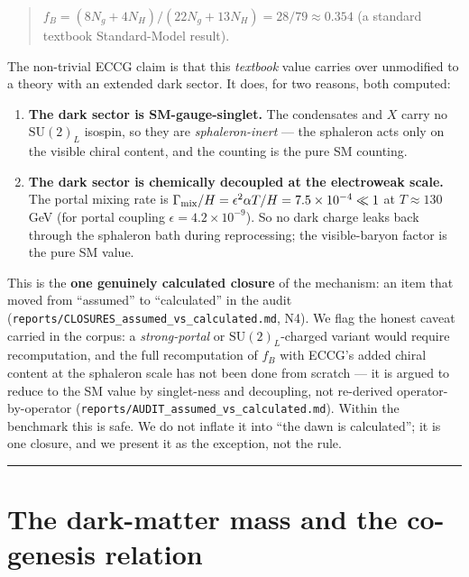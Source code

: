 \documentclass[aps,prd,preprint,nofootinbib,superscriptaddress]{revtex4-2}
\providecommand{\tightlist}{\setlength{\itemsep}{0pt}\setlength{\parskip}{0pt}}
\begin{document}
\begin{quote}
\(f_B = (8 N_g + 4 N_H) / (22 N_g + 13 N_H) = 28/79 \approx 0.354\) (a
standard textbook Standard-Model result).
\end{quote}

The non-trivial ECCG claim is that this \emph{textbook} value carries
over unmodified to a theory with an extended dark sector. It does, for
two reasons, both computed:

\begin{enumerate}
\def\labelenumi{\arabic{enumi}.}
\tightlist
\item
  \textbf{The dark sector is SM-gauge-singlet.} The condensates and
  \(X\) carry no \(\mathrm{SU}(2)_L\) isospin, so they are
  \emph{sphaleron-inert} --- the sphaleron acts only on the visible
  chiral content, and the counting is the pure SM counting.
\item
  \textbf{The dark sector is chemically decoupled at the electroweak
  scale.} The portal mixing rate is
  \(\Gamma_{\rm mix}/H = \epsilon^{2} \alpha T / H = 7.5\times10^{-4} \ll 1\)
  at \(T \approx 130\) GeV (for portal coupling
  \(\epsilon = 4.2\times10^{-9}\)). So no dark charge leaks back through
  the sphaleron bath during reprocessing; the visible-baryon factor is
  the pure SM value.
\end{enumerate}

This is the \textbf{one genuinely calculated closure} of the mechanism:
an item that moved from ``assumed'' to ``calculated'' in the audit
(\texttt{reports/\allowbreak CLOSURES\_\allowbreak assumed\_\allowbreak vs\_\allowbreak calculated.\allowbreak md}, N4). We flag the
honest caveat carried in the corpus: a \emph{strong-portal} or
\(\mathrm{SU}(2)_L\)-charged variant would require recomputation, and
the full recomputation of \(f_B\) with ECCG's added chiral content at
the sphaleron scale has not been done from scratch --- it is argued to
reduce to the SM value by singlet-ness and decoupling, not re-derived
operator-by-operator
(\texttt{reports/\allowbreak AUDIT\_\allowbreak assumed\_\allowbreak vs\_\allowbreak calculated.\allowbreak md}). Within the
benchmark this is safe. We do not inflate it into ``the dawn is
calculated''; it is one closure, and we present it as the exception, not
the rule.

\begin{center}\rule{0.5\linewidth}{0.5pt}\end{center}

\section{The dark-matter mass and the co-genesis relation}\label{sec-4}
\end{document}

